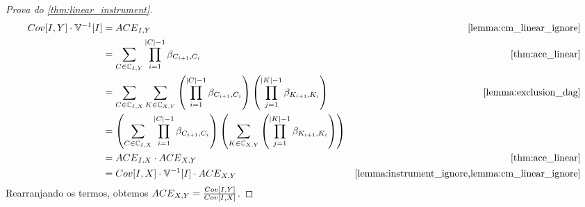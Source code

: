 \begin{proof}[Prova do \cref{thm:linear_instrument}]
 \begin{align*}
  Cov[I,Y] \cdot \V^{-1}[I]
  &= \ACE_{I,Y}
  & \text{\cref{lemma:cm_linear_ignore}} \\
  &= \sum_{C \in \mathbb{C}_{I,Y}} \prod_{i=1}^{|C|-1} \beta_{C_{i+1},C_i}
  & \text{\cref{thm:ace_linear}} \\
  &= \sum_{C \in \mathbb{C}_{I,X}} \sum_{K \in \mathbb{C}_{X,Y}}
  \left(\prod_{i=1}^{|C|-1} \beta_{C_{i+1},C_i}\right)
  \left(\prod_{j=1}^{|K|-1} \beta_{K_{i+1},K_i}\right) 
  & \text{\cref{lemma:exclusion_dag}} \\
  &= \left(\sum_{C \in \mathbb{C}_{I,X}} \prod_{i=1}^{|C|-1} \beta_{C_{i+1},C_i}\right)
  \left(\sum_{K \in \mathbb{C}_{X,Y}} \left(\prod_{j=1}^{|K|-1} \beta_{K_{i+1},K_i}\right)\right) \\
  &= \ACE_{I,X} \cdot \ACE_{X,Y}
  & \text{\cref{thm:ace_linear}} \\
  &= Cov[I,X] \cdot \V^{-1}[I] \cdot \ACE_{X,Y}
  & \text{\cref{lemma:instrument_ignore,lemma:cm_linear_ignore}}
 \end{align*}
 Rearranjando os termos, obtemos ${ACE}_{X,Y} = \frac{Cov[I,Y]}{Cov[I,X]}$.
\end{proof}

